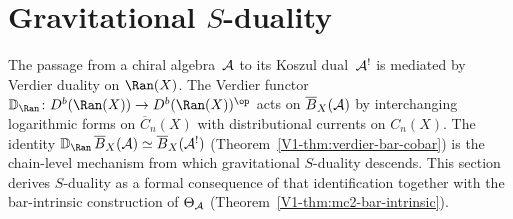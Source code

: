 
\section{Gravitational \texorpdfstring{$S$}{S}-duality}

\providecommand{\Bbbk}{\mathbb{k}}
\providecommand{\HS}{\operatorname{HS}}
\providecommand{\wt}{\operatorname{wt}}
\providecommand{\CE}{\operatorname{CE}}
\providecommand{\End}{\operatorname{End}}
\providecommand{\Hom}{\operatorname{Hom}}
\providecommand{\Sym}{\operatorname{Sym}}
\providecommand{\id}{\mathrm{id}}
\providecommand{\Tr}{\operatorname{Tr}}
\providecommand{\Det}{\operatorname{Det}}
\providecommand{\Aut}{\operatorname{Aut}}
\providecommand{\Spec}{\operatorname{Spec}}
\providecommand{\Res}{\operatorname{Res}}
\providecommand{\rank}{\operatorname{rank}}
\providecommand{\ad}{\operatorname{ad}}
\providecommand{\Fred}{\operatorname{Fred}}
\providecommand{\VD}{\mathbb{D}}
\providecommand{\DS}{\mathrm{DS}}
\providecommand{\fib}{\operatorname{fib}}
\providecommand{\CoDer}{\operatorname{CoDer}}
\providecommand{\MC}{\mathrm{MC}}
\providecommand{\Defcyc}{\mathrm{Def}_{\mathrm{cyc}}}
\providecommand{\Sh}{\mathrm{Sh}}
\providecommand{\gr}{\operatorname{gr}}
\providecommand{\Map}{\operatorname{Map}}
\providecommand{\RGamma}{R\Gamma}
\providecommand{\Perf}{\operatorname{Perf}}
\providecommand{\RHom}{\operatorname{RHom}}
\providecommand{\HH}{\operatorname{HH}}
\providecommand{\Loc}{\operatorname{Loc}}

The passage from a chiral algebra~$\mathcal{A}$ to its Koszul dual~$\mathcal{A}^!$
is mediated by Verdier duality on $\Ran(X)$. The Verdier functor
$\VD_{\Ran}\colon D^b(\Ran(X)) \to D^b(\Ran(X))^{\op}$
acts on $\overline{B}_X(\mathcal{A})$ by interchanging logarithmic forms on
$\overline{C}_n(X)$ with distributional currents on $C_n(X)$.
The identity
$\VD_{\Ran}\,\barB_X(\cA) \simeq \barB_X(\cA^!)$
(Theorem~\ref*{V1-thm:verdier-bar-cobar}) is the chain-level
mechanism from which gravitational $S$-duality descends.
This section derives $S$-duality as a formal consequence of
that identification together with the bar-intrinsic construction
of $\Theta_{\mathcal{A}}$ (Theorem~\ref*{V1-thm:mc2-bar-intrinsic}).

